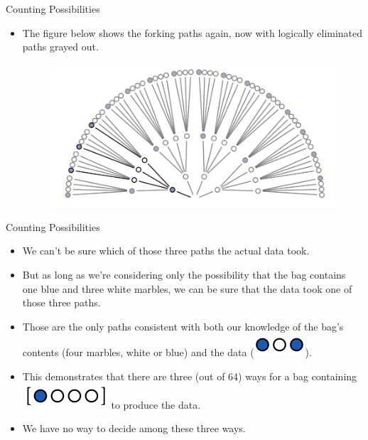 \documentclass[handout]{beamer}
\begin{document}
\begin{frame}{Counting Possibilities}
\scriptsize{
\begin{itemize}
 \item The figure below shows the forking paths again, now with logically eliminated paths grayed out.

\begin{figure}[h!]
	\centering
	\includegraphics[scale=0.33]{pics/marbles9.png}
\end{figure}
\end{itemize}
 } 
\end{frame}



\begin{frame}{Counting Possibilities}
\scriptsize{
\begin{itemize}
\item We can't be sure which of those three paths the actual data took.
\item But as long as we're considering only the possibility that the bag contains one blue and three white marbles, we can be sure that the data took one of those three paths.

\item Those are the only paths consistent with both our knowledge of the bag's contents (four marbles, white or blue) and the data (\includegraphics[scale=0.3]{pics/marbles2.png}).  

 \item This demonstrates that there are three (out of 64) ways for a bag containing \includegraphics[scale=0.3]{pics/marbles17.png} to produce the data.
 \item We have no way to decide among these three ways. 
\end{itemize}
 } 
\end{frame}
\end{document}
